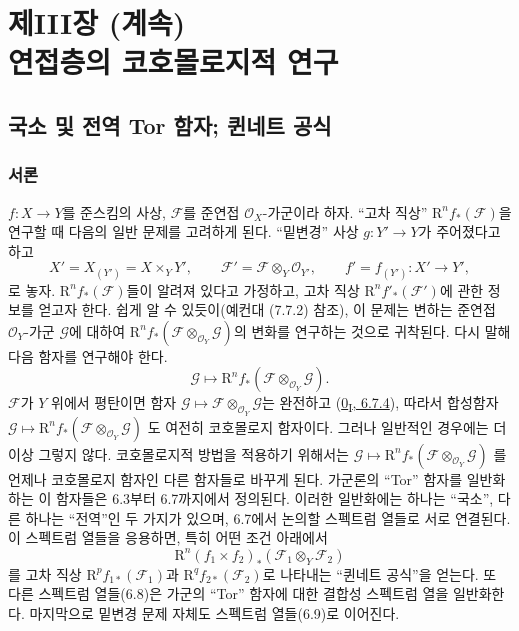 \chapter*{제III장 (계속)\\[1.2ex]
\Large 연접층의 코호몰로지적 연구}

\section{국소 및 전역 Tor 함자; 퀸네트 공식}
\label{section:III.6.fr}

\subsection{서론}
\label{subsection:III.6.1.fr}


\begin{env}[6.1.1]
\label{III.6.1.1-fr}
$f:X\to Y$를 준스킴의 사상, $\mathscr F$를 준연접
$\mathscr O_X$-가군이라 하자. ``고차 직상''
$\mathrm R^n f_*(\mathscr F)$을 연구할 때 다음의 일반 문제를 고려하게
된다. ``밑변경'' 사상 $g:Y'\to Y$가 주어졌다고 하고
\[
  X'=X_{(Y')}=X\times_Y Y',\qquad
  \mathscr F'=\mathscr F\otimes_Y\mathscr O_{Y'},\qquad
  f'=f_{(Y')}:X'\to Y',
\]
로 놓자. $\mathrm R^n f_*(\mathscr F)$들이 알려져 있다고 가정하고,
고차 직상 $\mathrm R^n f'_*(\mathscr F')$에 관한 정보를 얻고자 한다.
쉽게 알 수 있듯이(예컨대 (7.7.2) 참조), 이 문제는 변하는 준연접
$\mathscr O_Y$-가군 $\mathscr G$에 대하여
$\mathrm R^n f_*(\mathscr F\otimes_{\mathscr O_Y}\mathscr G)$의 변화를
연구하는 것으로 귀착된다. 다시 말해 다음 함자를 연구해야 한다.
\[
  \mathscr G\longmapsto
  \mathrm R^n f_*(\mathscr F\otimes_{\mathscr O_Y}\mathscr G).
\]
$\mathscr F$가 $Y$ 위에서 평탄이면 함자
$\mathscr G\mapsto\mathscr F\otimes_{\mathscr O_Y}\mathscr G$는 완전하고
(\hyperref[0.6.7.4-ko]{0\textsubscript{I}, 6.7.4}), 따라서 합성함자
$\mathscr G\mapsto\mathrm R^n f_*(\mathscr F\otimes_{\mathscr O_Y}\mathscr G)$
도 여전히 코호몰로지 함자이다. 그러나 일반적인 경우에는 더 이상 그렇지
않다. 코호몰로지적 방법을 적용하기 위해서는
$\mathscr G\mapsto\mathrm R^n f_*(\mathscr F\otimes_{\mathscr O_Y}\mathscr G)$
를 언제나 코호몰로지 함자인 다른 함자들로 바꾸게 된다. 가군론의 ``Tor''
함자를 일반화하는 이 함자들은 6.3부터 6.7까지에서 정의된다. 이러한
일반화에는 하나는 ``국소'', 다른 하나는 ``전역''인 두 가지가 있으며,
6.7에서 논의할 스펙트럼 열들로 서로 연결된다. 이 스펙트럼 열들을 응용하면,
특히 어떤 조건 아래에서
\[
  \mathrm R^n(f_1\times f_2)_*(\mathscr F_1\otimes_Y\mathscr F_2)
\]
를 고차 직상 $\mathrm R^p f_{1*}(\mathscr F_1)$과
$\mathrm R^q f_{2*}(\mathscr F_2)$로 나타내는 ``퀸네트 공식''을 얻는다.
또 다른 스펙트럼 열들(6.8)은 가군의 ``Tor'' 함자에 대한 결합성 스펙트럼
열을 일반화한다. 마지막으로 밑변경 문제 자체도 스펙트럼 열들(6.9)로
이어진다.
\end{env}


